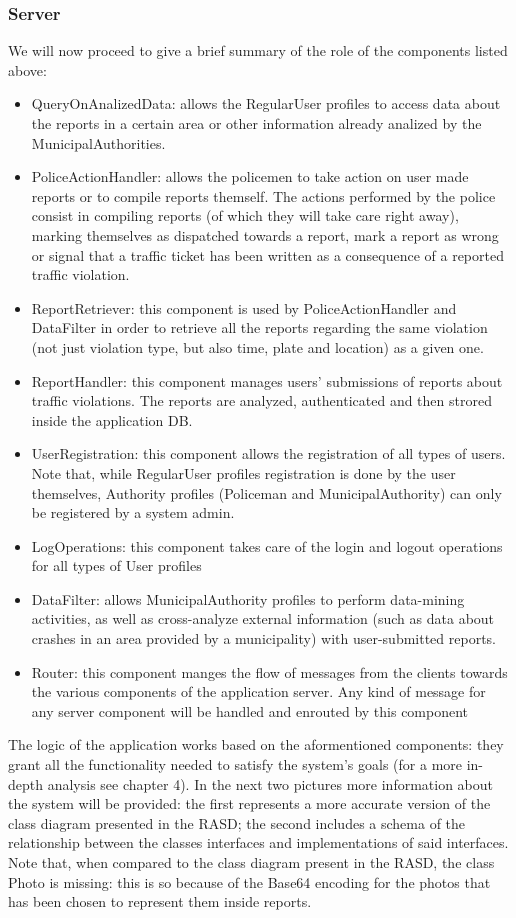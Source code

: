 \subsubsection{Server}
We will now proceed to give a brief summary of the role of the components listed above:
\begin{itemize}
\item QueryOnAnalizedData: allows the RegularUser profiles to access data about the reports in a certain area or other information already analized by the MunicipalAuthorities.
\item PoliceActionHandler: allows the policemen to take action on user made reports or to compile reports themself. The actions performed by the police consist in compiling reports (of which they will take care right away), marking themselves as dispatched towards a report, mark a report as wrong or signal that a traffic ticket has been written as a consequence of a reported traffic violation.
\item ReportRetriever: this component is used by PoliceActionHandler and DataFilter in order to retrieve all the reports regarding the same violation (not just violation type, but also time, plate and location) as a given one. 
\item ReportHandler: this component manages users' submissions of reports about traffic violations. The reports are analyzed, authenticated and then strored inside the application DB.
\item UserRegistration: this component allows the registration of all types of users. Note that, while RegularUser profiles registration is done by the user themselves, Authority profiles (Policeman and MunicipalAuthority) can only be registered by a system admin.
\item LogOperations: this component takes care of the login and logout operations for all types of User profiles
\item DataFilter: allows MunicipalAuthority profiles to perform data-mining activities,  as well as cross-analyze external information (such as data about crashes in an area provided by a municipality) with user-submitted reports.
\item Router: this component manges the flow of messages from the clients towards the various components of the application server. Any kind of message for any server component will be handled and enrouted by this component
\end{itemize}
The logic of the application works based on the aformentioned components: they grant all the functionality needed to satisfy the system's goals (for a more in-depth analysis see chapter 4).
In the next two pictures more information about the system will be provided: the first represents a more accurate version of the class diagram presented in the RASD; the second includes a schema of the relationship between the classes interfaces and implementations of said interfaces. \newline
Note that, when compared to the class diagram present in the RASD, the class Photo is missing: this is so because of the Base64 encoding for the photos that has been chosen to represent them inside reports.

